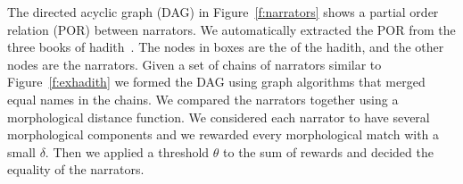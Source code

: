 \documentclass[11pt]{article}
\begin{document}
\begin{figure}[tb]
\end{figure}

The directed acyclic graph (DAG) 
in Figure~\ref{f:narrators} shows a partial order relation (POR) 
between narrators.
We automatically extracted the POR from the three books of 
hadith~\cite{IbnHanbal,AlKulayni,AlTousi}.
The nodes in boxes are the  of the hadith, 
and the other nodes are the narrators.
Given a set of chains of narrators similar to 
Figure~\ref{f:exhadith} we formed the DAG using graph algorithms 
that merged equal names in the chains. 
We compared the narrators together using a morphological
distance function. 
We considered each narrator to have several morphological 
components and we rewarded every morphological match with 
a small $\delta$. 
Then we applied a threshold $\theta$ to the sum of rewards
and decided the equality of the narrators. 
\end{document}
